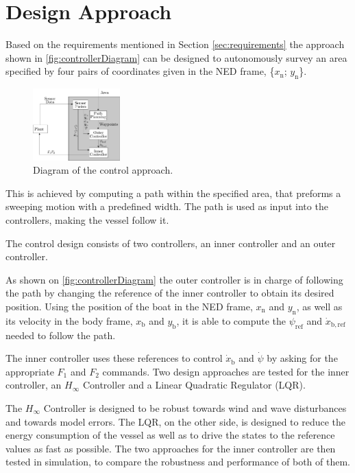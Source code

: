 \chapter{Design Approach} \label{chap:designaproach}
Based on the requirements mentioned in Section \ref{sec:requirements} the approach shown in \autoref{fig:controllerDiagram} can be designed to autonomously survey an area specified by four pairs of coordinates given in the NED frame, \{$x_\mathrm{n}$; $y_\mathrm{n}$\}.

\begin{figure}[H]
    \includegraphics[width=0.3\textwidth]{figures/controllerDiagram2}
    \caption{Diagram of the control approach.}
    \label{fig:controllerDiagram}
\end{figure}

This is achieved by computing a path within the specified area, that preforms a sweeping motion with a predefined width. The path is used as input into the controllers, making the vessel follow it. 

The control design consists of two controllers, an inner controller and an outer controller. 

As shown on \autoref{fig:controllerDiagram} the outer controller is in charge of following the path by changing the reference of the inner controller to obtain its desired position. Using the position of the boat in the NED frame, $x_\mathrm{n}$ and $y_\mathrm{n}$, as well as its velocity in the body frame, $x_\mathrm{b}$ and $y_\mathrm{b}$, it is able to compute the $\psi_\mathrm{ref}$ and $\dot{x}_\mathrm{b,ref}$ needed to follow the path. 

The inner controller uses these references to control $\dot{x}_\mathrm{b}$ and $\dot{\psi}$ by asking for the appropriate $F_1$ and $F_2$ commands. Two design approaches are tested for the inner controller, an $H_{\infty}$ Controller and a Linear Quadratic Regulator (LQR).

The $H_{\infty}$ Controller is designed to be robust towards wind and wave disturbances and towards model errors. The LQR, on the other side, is designed to reduce the energy consumption of the vessel as well as to drive the states to the reference values as fast as possible. 
The two approaches for the inner controller are then tested in simulation, to compare the robustness and performance of both of them.

